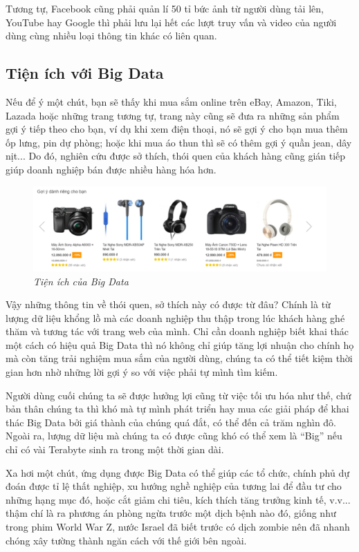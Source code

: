 \documentclass[12pt]{report}
\begin{document}
Tương tự, Facebook cũng phải quản lí 50 tỉ bức ảnh từ người dùng tải lên, YouTube hay Google thì phải lưu lại hết các lượt truy vấn và video của người dùng cùng nhiều loại thông tin khác có liên quan.

\subsection{Tiện ích với Big Data}
Nếu để ý một chút, bạn sẽ thấy khi mua sắm online trên eBay, Amazon, Tiki, Lazada hoặc những trang tương tự, trang này cũng sẽ đưa ra những sản phẩm gợi ý tiếp theo cho bạn, ví dụ khi xem điện thoại, nó sẽ gợi ý cho bạn mua thêm ốp lưng, pin dự phòng; hoặc khi mua áo thun thì sẽ có thêm gợi ý quần jean, dây nịt... Do đó, nghiên cứu được sở thích, thói quen của khách hàng cũng gián tiếp giúp doanh nghiệp bán được nhiều hàng hóa hơn.

\begin{figure}[H]
\centering
\includegraphics[scale=1]{ebay.png}
\caption{\it Tiện ích của Big Data}
\end{figure}

Vậy những thông tin về thói quen, sở thích này có được từ đâu? Chính là từ lượng dữ liệu khổng lồ mà các doanh nghiệp thu thập trong lúc khách hàng ghé thăm và tương tác với trang web của mình. Chỉ cần doanh nghiệp biết khai thác một cách có hiệu quả Big Data thì nó không chỉ giúp tăng lợi nhuận cho chính họ mà còn tăng trải nghiệm mua sắm của người dùng, chúng ta có thể tiết kiệm thời gian hơn nhờ những lời gợi ý so với việc phải tự mình tìm kiếm.

Người dùng cuối chúng ta sẽ được hưởng lợi cũng từ việc tối ưu hóa như thế, chứ bản thân chúng ta thì khó mà tự mình phát triển hay mua các giải pháp để khai thác Big Data bởi giá thành của chúng quá đắt, có thể đến cả trăm nghìn đô. Ngoài ra, lượng dữ liệu mà chúng ta có được cũng khó có thể xem là “Big” nếu chỉ có vài Terabyte sinh ra trong một thời gian dài.

Xa hơi một chút, ứng dụng được Big Data có thể giúp các tổ chức, chính phủ dự đoán được tỉ lệ thất nghiệp, xu hướng nghề nghiệp của tương lai để đầu tư cho những hạng mục đó, hoặc cắt giảm chi tiêu, kích thích tăng trưởng kinh tế, v.v... thậm chí là ra phương án phòng ngừa trước một dịch bệnh nào đó, giống như trong phim World War Z, nước Israel đã biết trước có dịch zombie nên đã nhanh chóng xây tường thành ngăn cách với thế giới bên ngoài.
\end{document}
